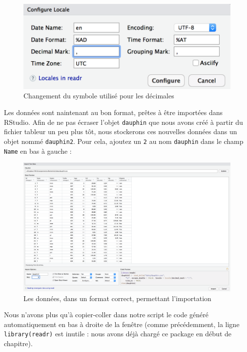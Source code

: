 \documentclass[a4paperpaper,]{article}
\begin{document}
\begin{figure}[htpb]

{\centering \includegraphics[width=0.5\linewidth]{images/importcsv3} 

}

\caption{Changement du symbole utilisé pour les décimales}\label{fig:importcsv3}
\end{figure}

Les données sont naintenant au bon format, prêtes à être importées dans RStudio. Afin de ne pas écraser l'objet \texttt{dauphin} que nous avons créé à partir du fichier tableur un peu plus tôt, nous stockerons ces nouvelles données dans un objet nommé \texttt{dauphin2}. Pour cela, ajoutez un \texttt{2} au nom \texttt{dauphin} dans le champ \texttt{Name} en bas à gauche :

\begin{figure}[htpb]

{\centering \includegraphics[width=1\linewidth]{images/importcsv4} 

}

\caption{Les données, dans un format correct, permettant l'importation}\label{fig:importcsv4}
\end{figure}

Nous n'avons plus qu'à copier-coller dans notre script le code généré automatiquement en bas à droite de la fenêtre (comme précédemment, la ligne \texttt{library(readr)} est inutile : nous avons déjà chargé ce package en début de chapitre).
\end{document}
